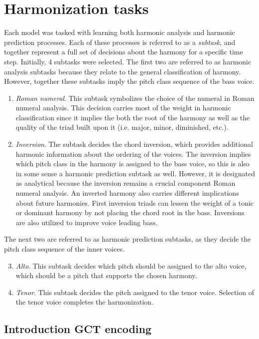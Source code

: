 \documentclass[11pt]{article}
\begin{document}
\section{Harmonization tasks}

Each model was tasked with learning both harmonic analysis and harmonic prediction processes. Each of these processes is referred to as a \textit{subtask}, and together represent a full set of decisions about the harmony for a specific time step. Initially, 4 subtasks were selected. The first two are referred to as harmonic analysis subtasks because they relate to the general classification of harmony. However, together these subtasks imply the pitch class sequence of the bass voice.
\begin{enumerate}
\item \textit{Roman numeral}. This subtask symbolizes the choice of the numeral in Roman numeral analysis. This decision carries most of the weight in harmonic classification since it implies the both the root of the harmony as well as the quality of the triad built upon it (i.e. major, minor, diminished, etc.).
\item \textit{Inversion}. The subtask decides the chord inversion, which provides additional harmonic information about the ordering of the voices. The inversion implies which pitch class in the harmony is assigned to the bass voice, so this is also in some sense a harmonic prediction subtask as well. However, it is designated as analytical because the inversion remains a crucial component Roman numeral analysis. An inverted harmony also carries different implications about future harmonies. First inversion triads can lessen the weight of a tonic or dominant harmony by not placing the chord root in the bass. Inversions are also utilized to improve voice leading bass.
\end{enumerate}
The next two are referred to as harmonic prediction subtasks, as they decide the pitch class sequence of the inner voices.
\begin{enumerate}
\setcounter{enumi}{2}
\item \textit{Alto}. This subtask decides which pitch should be assigned to the alto voice, which should be a pitch that supports the chosen harmony. 
\item \textit{Tenor}. This subtask decides the pitch assigned to the tenor voice. Selection of the tenor voice completes the harmonization.
\end{enumerate}

\subsection{Introduction GCT encoding}
\end{document}

